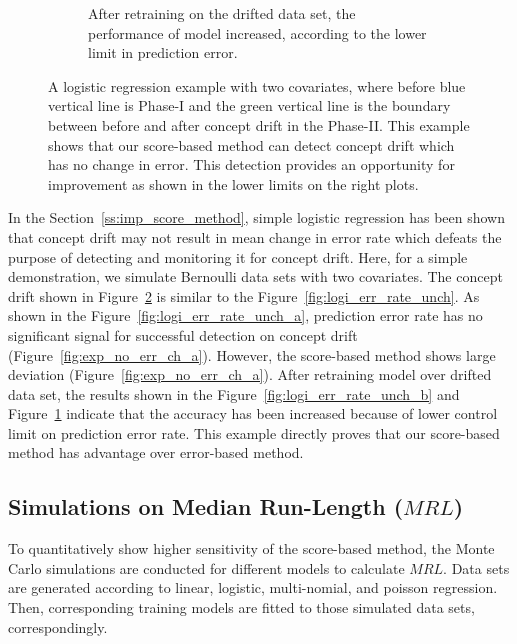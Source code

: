 \documentclass[twoside,11pt]{article}
\begin{document}
\begin{figure}[!htp]
\begin{subfigure}[t]{0.49\linewidth}
         \caption{After retraining on the drifted data set, the performance of model increased, according to the lower limit in prediction error.}
         \label{fig:exp_no_err_ch_b}
  \end{subfigure}
  \caption{A logistic regression example with two covariates, where before blue vertical line is Phase-I and the green vertical line is the boundary between before and after concept drift in the Phase-II. This example shows that our score-based method can detect concept drift which has no change in error. This detection provides an opportunity for improvement as shown in the lower limits on the right plots.}
  \label{fig:exp_no_err_ch}
\end{figure}
In the Section~\ref{ss:imp_score_method}, simple logistic regression has been shown that concept drift may not result in mean change in error rate which defeats the purpose of detecting and monitoring it for concept drift. Here, for a simple demonstration, we simulate Bernoulli data sets with two covariates. The concept drift shown in Figure~\ref{fig:exp_no_err_ch} is similar to the Figure~\ref{fig:logi_err_rate_unch}. As shown in the Figure~\ref{fig:logi_err_rate_unch_a}, prediction error rate has no significant signal for successful detection on concept drift (Figure~\ref{fig:exp_no_err_ch_a}). However, the score-based method shows large deviation (Figure~\ref{fig:exp_no_err_ch_a}). After retraining model over drifted data set, the results shown in the Figure~\ref{fig:logi_err_rate_unch_b} and Figure~\ref{fig:exp_no_err_ch_b} indicate that the accuracy has been increased because of lower control limit on prediction error rate. This example directly proves that our score-based method has advantage over error-based method. 

\subsection{Simulations on Median Run-Length ($MRL$)}
\label{ss:simu_MRL}
To quantitatively show higher sensitivity of the score-based method, the Monte Carlo simulations are conducted for different models to calculate $MRL$. Data sets are generated according to linear, logistic, multi-nomial, and poisson regression. Then, corresponding training models are fitted to those simulated data sets, correspondingly.
\end{document}
